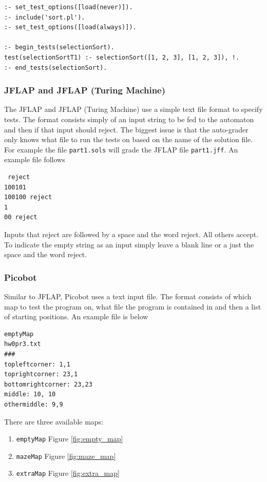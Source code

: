 \documentclass[11pt]{report}
\begin{document}
\begin{verbatim}
:- set_test_options([load(never)]).
:- include('sort.pl').
:- set_test_options([load(always)]).

:- begin_tests(selectionSort).
test(selectionSortT1) :- selectionSort([1, 2, 3], [1, 2, 3]), !.
:- end_tests(selectionSort).
\end{verbatim}

\subsubsection{JFLAP and JFLAP (Turing Machine)}
The JFLAP and JFLAP (Turing Machine) use a simple text file format to specify tests. 
The format consists simply of an input string to be fed to the automaton and then 
if that input should reject. The biggest issue is that the auto-grader only knows what
file to run the tests on based on the name of the solution file. For example the file 
\texttt{part1.sols} will grade the JFLAP file \texttt{part1.jff}. An example file follows

\begin{verbatim}
 reject
100101
100100 reject
1
00 reject
\end{verbatim}

Inputs that reject are followed by a space and the word reject. All others accept. To indicate the empty 
string as an input simply leave a blank line or a just the space and the word reject.

\subsubsection{Picobot}
Similar to JFLAP, Picobot uses a text input file. The format consists of which map to test the 
program on, what file the program is contained in and then a list of starting positions. An example
file is below

\begin{verbatim}
emptyMap
hw0pr3.txt
###
topleftcorner: 1,1
toprightcorner: 23,1
bottomrightcorner: 23,23
middle: 10, 10
othermiddle: 9,9
\end{verbatim}

There are three available maps:
\begin{enumerate}
\item \texttt{emptyMap} Figure \ref{fig:empty_map}
\item \texttt{mazeMap} Figure \ref{fig:maze_map}
\item \texttt{extraMap} Figure \ref{fig:extra_map}
\end{enumerate}
\end{document}
